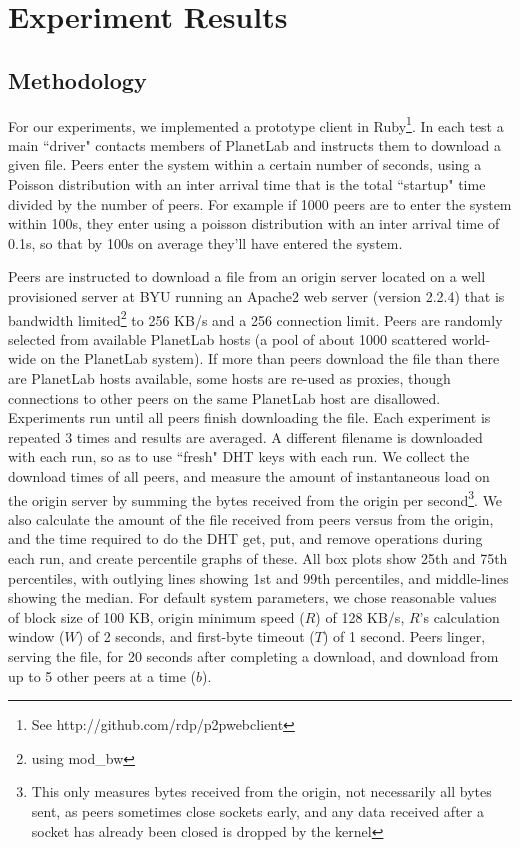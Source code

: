
\section{Experiment Results}

\subsection {Methodology} 

For our experiments, we implemented a prototype client in Ruby\footnote{See http://github.com/rdp/p2pwebclient}.
In each test a main ``driver" contacts members of PlanetLab and instructs them to download a given file.
Peers enter the system within a certain number of seconds, using a Poisson distribution with an inter 
arrival time that is the total ``startup" time divided by the number of peers.
For example if 1000 peers are to enter the system within 100s, they enter using a poisson distribution with an 
inter arrival time of 0.1s, so that by 100s on average they'll have entered the system.

Peers are instructed to download a file from 
an origin server located on a well provisioned server at BYU running an Apache2 web server (version 2.2.4) that is
bandwidth limited\footnote{using mod\_bw} to 256 KB/s and a 256 connection limit. 
Peers are randomly selected from available PlanetLab 
hosts (a pool of about 1000 scattered world-wide on the PlanetLab system).  If more than peers download the file than
there are PlanetLab hosts available, some hosts are re-used as proxies, though connections to other peers on the same PlanetLab
host are disallowed.  Experiments run until 
all peers finish downloading the file. Each experiment is repeated 3 times and results are averaged. 
A different filename is downloaded with each run, so as to use ``fresh" DHT keys with each run. We collect the download 
times of all peers, and measure the amount of instantaneous load on the origin server by summing the 
bytes received from the origin per second\footnote{This only measures bytes received from the origin, not necessarily all bytes sent, 
as peers sometimes close sockets early, and any data received after a socket has already been closed is dropped by the kernel}. We also calculate the amount 
of the file received from peers versus from the origin, and the time required to do the DHT 
get, put, and remove operations during each run, and create percentile graphs of these.  
All box plots show 25th and 75th percentiles, with outlying lines showing
1st and 99th percentiles, and middle-lines showing the median.
For default system parameters, we chose reasonable values 
of block size of 100 KB, origin minimum speed ($R$) of 128 KB/s, $R$'s calculation window ($W$) 
of 2 seconds, and first-byte timeout ($T$) of 1 second. Peers linger, serving the file, for 20 seconds after completing 
a download, and download from up to 5 other peers at a time ($b$).

